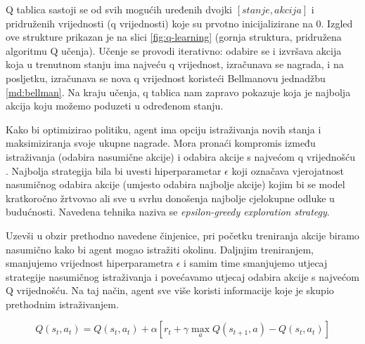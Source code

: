 Q tablica sastoji se od svih mogućih uređenih dvojki $[stanje, akcija]$ i pridruženih vrijednosti (q vrijednosti) koje su prvotno inicijalizirane na $0$. Izgled ove strukture prikazan je na slici \ref{fig:q-learning} (gornja struktura, pridružena algoritmu Q učenja). Učenje se provodi iterativno: odabire se i izvršava akcija koja u trenutnom stanju ima najveću q vrijednost, izračunava se nagrada, i na posljetku, izračunava se nova q vrijednost koristeći Bellmanovu jednadžbu \ref{md:bellman}. Na kraju učenja, q tablica nam zapravo pokazuje koja je najbolja akcija koju možemo poduzeti u određenom stanju.

Kako bi optimizirao politiku, agent ima opciju istraživanja novih stanja i maksimiziranja svoje ukupne nagrade. Mora pronaći kompromis između istraživanja (odabira nasumične akcije)  i odabira akcije s najvećom q vrijednošću . Najbolja strategija bila bi uvesti hiperparametar $\epsilon$ koji označava vjerojatnost nasumičnog odabira akcije (umjesto odabira najbolje akcije) kojim bi se model kratkoročno žrtvovao ali sve u svrhu donošenja najbolje cjelokupne odluke u budućnosti. Navedena tehnika naziva se \textit{epsilon-greedy exploration strategy}.

Uzevši u obzir prethodno navedene činjenice, pri početku treniranja akcije biramo nasumično kako bi agent mogao istražiti okolinu. Daljnjim treniranjem, smanjujemo vrijednost hiperparametra $\epsilon$ i samim time smanjujemo utjecaj strategije nasumičnog istraživanja i povećavamo utjecaj odabira akcije s najvećom Q vrijednošću. Na taj način, agent sve više koristi informacije koje je skupio prethodnim istraživanjem. 



\begin{equation}
    \label{md:bellman}
    Q(s_t, a_t) = Q(s_t, a_t) + \alpha \left[ r_t + \gamma \max_a Q(s_{t+1}, a) - Q(s_t, a_t) \right]
\end{equation}

\bigskip

